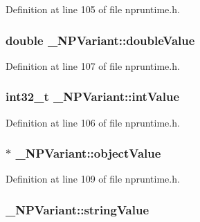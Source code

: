 Definition at line 105 of file npruntime.h.

\hypertarget{struct___n_p_variant_a8977f45878e22f3b9a51ee0f19998fbe}{
\subsubsection[{doubleValue}]{\setlength{\rightskip}{0pt plus 5cm}double {\bf \_\-NPVariant::doubleValue}}}
\label{struct___n_p_variant_a8977f45878e22f3b9a51ee0f19998fbe}


Definition at line 107 of file npruntime.h.

\hypertarget{struct___n_p_variant_a0099a5d52f1601aa7d4c15df4aa42f05}{
\subsubsection[{intValue}]{\setlength{\rightskip}{0pt plus 5cm}int32\_\-t {\bf \_\-NPVariant::intValue}}}
\label{struct___n_p_variant_a0099a5d52f1601aa7d4c15df4aa42f05}


Definition at line 106 of file npruntime.h.

\hypertarget{struct___n_p_variant_a061fbdaf1fdb181af2329408edd0aa74}{
\subsubsection[{objectValue}]{$\ast$ {\bf \_\-NPVariant::objectValue}}}
\label{struct___n_p_variant_a061fbdaf1fdb181af2329408edd0aa74}


Definition at line 109 of file npruntime.h.

\hypertarget{struct___n_p_variant_a1d5497be17b1b6d84a5830c2160e82ca}{
\subsubsection[{stringValue}]{ {\bf \_\-NPVariant::stringValue}}}
\label{struct___n_p_variant_a1d5497be17b1b6d84a5830c2160e82ca}


